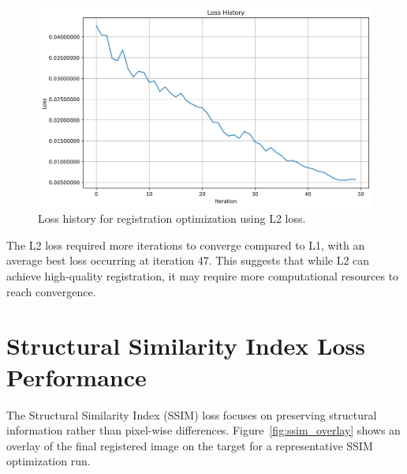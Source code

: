 \begin{figure}[htpb]
  \centering
  \includegraphics[scale=0.65]{figures/l2/loss_history.png}
  \caption[Loss history for L2 optimization]{Loss history for registration optimization using L2 loss.}
  \label{fig:l2_history}
\end{figure}

The L2 loss required more iterations to converge compared to L1, with an average best loss occurring at iteration 47. This suggests that while L2 can achieve high-quality registration, it may require more computational resources to reach convergence.

\section{Structural Similarity Index Loss Performance}

The Structural Similarity Index (SSIM) loss focuses on preserving structural information rather than pixel-wise differences. Figure~\ref{fig:ssim_overlay} shows an overlay of the final registered image on the target for a representative SSIM optimization run.

